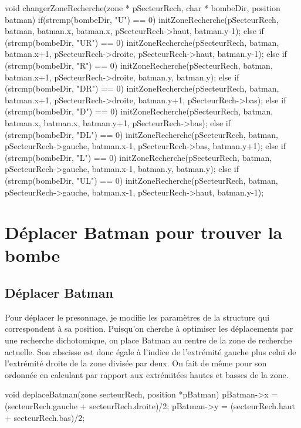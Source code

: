 \documentclass{article}
\begin{document}
\begin{boxedverbatim}
void changerZoneRecherche(zone * pSecteurRech, char * bombeDir,
  position batman)
{
  if(strcmp(bombeDir, "U") == 0) {
    initZoneRecherche(pSecteurRech, batman, batman.x, batman.x,
      pSecteurRech->haut, batman.y-1);
  }
  else if (strcmp(bombeDir, "UR") == 0) {
    initZoneRecherche(pSecteurRech, batman, batman.x+1, pSecteurRech->droite,
      pSecteurRech->haut, batman.y-1);
  }
  else if (strcmp(bombeDir, "R") == 0) {
    initZoneRecherche(pSecteurRech, batman, batman.x+1, pSecteurRech->droite,
      batman.y, batman.y);
  }
  else if (strcmp(bombeDir, "DR") == 0) {
    initZoneRecherche(pSecteurRech, batman, batman.x+1, pSecteurRech->droite,
      batman.y+1, pSecteurRech->bas);
  }
  else if (strcmp(bombeDir, "D") == 0) {
    initZoneRecherche(pSecteurRech, batman, batman.x, batman.x, batman.y+1,
      pSecteurRech->bas);
  }
  else if (strcmp(bombeDir, "DL") == 0) {
    initZoneRecherche(pSecteurRech, batman, pSecteurRech->gauche, batman.x-1,
      pSecteurRech->bas, batman.y+1);
  }
  else if (strcmp(bombeDir, "L") == 0) {
    initZoneRecherche(pSecteurRech, batman, pSecteurRech->gauche, batman.x-1,
      batman.y, batman.y);
  }
  else if (strcmp(bombeDir, "UL") == 0) {
    initZoneRecherche(pSecteurRech, batman, pSecteurRech->gauche, batman.x-1,
      pSecteurRech->haut, batman.y-1);
  }
}
\end{boxedverbatim}


\section{Déplacer Batman pour trouver la bombe}

\subsection{Déplacer Batman}
Pour déplacer le presonnage, je modifie les paramètres de la structure qui correspondent à sa position. Puisqu'on cherche à optimiser les déplacements par une recherche dichotomique, on place Batman au centre de la zone de recherche actuelle. Son abscisse est donc égale à l'indice de l'extrémité gauche plus celui de l'extrémité droite de la zone divisée par deux. On fait de même pour son ordonnée en calculant par rapport aux extrémitées hautes et basses de la zone.
\\

\begin{boxedverbatim}
void deplaceBatman(zone secteurRech, position *pBatman)
{
  pBatman->x = (secteurRech.gauche + secteurRech.droite)/2;
  pBatman->y = (secteurRech.haut + secteurRech.bas)/2;
}
\end{boxedverbatim}
\end{document}
